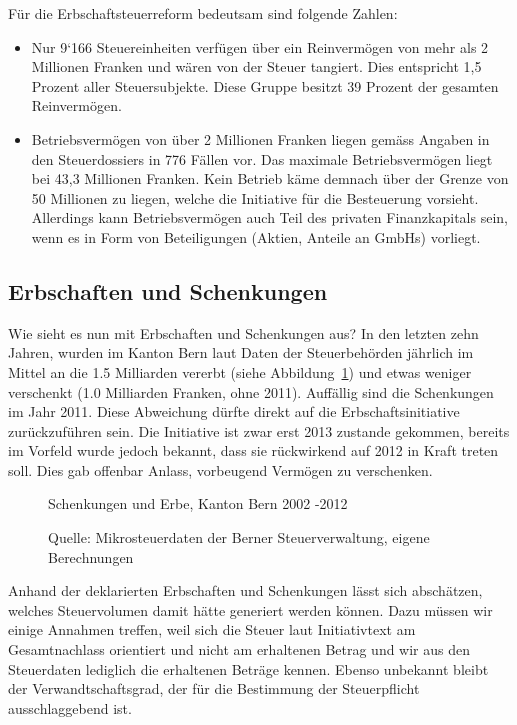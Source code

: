 \documentclass[a4paper, 12pt,liststotoc]{scrartcl}
\numberwithin{equation}{section}
\begin{document}
Für die Erbschaftsteuerreform bedeutsam sind folgende Zahlen:

\begin{itemize}
\item
  Nur 9`166 Steuereinheiten verfügen über ein Reinvermögen von mehr als
  2 Millionen Franken und wären von der Steuer tangiert. Dies entspricht
  1,5 Prozent aller Steuersubjekte. Diese Gruppe besitzt 39 Prozent der
  gesamten Reinvermögen.
\item
  Betriebsvermögen von über 2 Millionen Franken liegen gemäss Angaben in
  den Steuerdossiers in 776 Fällen vor. Das maximale Betriebsvermögen
  liegt bei 43,3 Millionen Franken. Kein Betrieb käme demnach über der
  Grenze von 50 Millionen zu liegen, welche die Initiative für die
  Besteuerung vorsieht. Allerdings kann Betriebsvermögen auch Teil des
  privaten Finanzkapitals sein, wenn es in Form von Beteiligungen
  (Aktien, Anteile an GmbHs) vorliegt.
\end{itemize}

\subsection{ Erbschaften und Schenkungen
    }\label{erbschaften-und-schenkungen}

Wie sieht es nun mit Erbschaften und Schenkungen aus? In den letzten
zehn Jahren, wurden im Kanton Bern laut Daten der Steuerbehörden
jährlich im Mittel an die 1.5 Milliarden vererbt (siehe Abbildung~\ref{fig:schenkungen_und_erbe}) und etwas weniger
verschenkt (1.0 Milliarden Franken, ohne 2011). Auffällig sind die
Schenkungen im Jahr 2011. Diese Abweichung dürfte direkt auf die
Erbschaftsinitiative zurückzuführen sein. Die Initiative ist zwar erst
2013 zustande gekommen, bereits im Vorfeld wurde jedoch bekannt, dass
sie rückwirkend auf 2012 in Kraft treten soll. Dies gab offenbar Anlass,
vorbeugend Vermögen zu verschenken.

\begin{figure}[!ht]
  \caption{Schenkungen und Erbe, Kanton Bern 2002 -2012}
  \label{fig:schenkungen_und_erbe}
  \centering
  \caption*{Quelle: Mikrosteuerdaten der Berner Steuerverwaltung, eigene Berechnungen}
\end{figure}

Anhand der deklarierten Erbschaften und Schenkungen lässt sich
abschätzen, welches Steuervolumen damit hätte generiert werden können.
Dazu müssen wir einige Annahmen treffen, weil sich die Steuer laut
Initiativtext am Gesamtnachlass orientiert und nicht am erhaltenen
Betrag und wir aus den Steuerdaten lediglich die erhaltenen Beträge
kennen. Ebenso unbekannt bleibt der Verwandtschaftsgrad, der für die
Bestimmung der Steuerpflicht ausschlaggebend ist.
\end{document}
